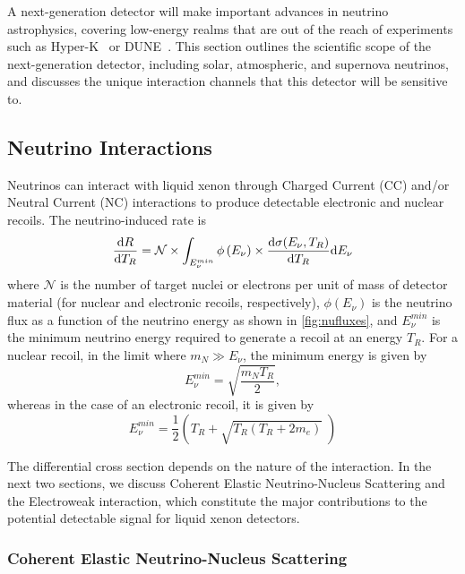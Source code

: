 A next-generation detector will make important advances in neutrino astrophysics, covering low-energy realms that are out of the reach of experiments such as Hyper-K~\cite{Abe:2018uyc} or DUNE~\cite{Acciarri:2016crz}. This section outlines the scientific scope of the next-generation detector, including solar, atmospheric, and supernova neutrinos, and discusses the unique interaction channels that this detector will be sensitive to. 

\subsection{Neutrino Interactions}

Neutrinos can interact with liquid xenon through Charged Current (CC) and/or Neutral Current (NC) interactions to produce detectable electronic and nuclear recoils. The neutrino-induced rate is
\begin{equation}
\frac{{\rm d}R}{{\rm d}T_R} = \mathcal{N} \times \int_{E_{\nu}^{min}}{\phi\left(E_{\nu}\right) \times \frac{{\rm d}\sigma(E_\nu, T_R)}{{\rm d}T_R} {\rm d}E_\nu}
\end{equation}
where $\mathcal{N}$ is the number of target nuclei or electrons per unit of mass of detector material (for nuclear and electronic recoils, respectively), $\phi\left(E_{\nu}\right)$ is the neutrino flux as a function of the neutrino energy as shown in \autoref{fig:nufluxes}, and $E_{\nu}^{min}$ is the minimum neutrino energy required to generate a recoil at an energy $T_R$. For a nuclear recoil, in the limit where $m_N \gg E_\nu$, the minimum energy is given by 
\begin{equation}
E_{\nu}^{min} = \sqrt{\frac{m_N T_R}{2}},
\end{equation}
whereas in the case of an electronic recoil, it is given by 
\begin{equation}
E_{\nu}^{min} = \frac{1}{2}\left( T_R + \sqrt{T_R\left( T_R + 2m_e \right)}\; \right)
\end{equation}

The differential cross section depends on the nature of the interaction. In the next two sections, we discuss Coherent Elastic Neutrino-Nucleus Scattering and the Electroweak interaction, which constitute the major contributions to the potential detectable signal for liquid xenon detectors.

\subsubsection{Coherent Elastic Neutrino-Nucleus Scattering} \label{sec:cevns}

